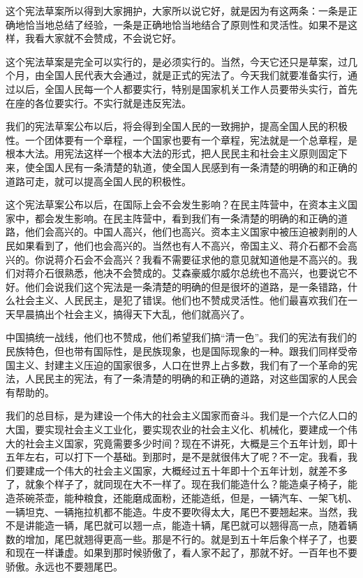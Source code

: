 这个宪法草案所以得到大家拥护，大家所以说它好，就是因为有这两条：一条是正确地恰当地总结了经验，一条是正确地恰当地结合了原则性和灵活性。如果不是这样，我看大家就不会赞成，不会说它好。

这个宪法草案是完全可以实行的，是必须实行的。当然，今天它还只是草案，过几个月，由全国人民代表大会通过，就是正式的宪法了。今天我们就要准备实行，通过以后，全国人民每一个人都要实行，特别是国家机关工作人员要带头实行，首先在座的各位要实行。不实行就是违反宪法。

我们的宪法草案公布以后，将会得到全国人民的一致拥护，提高全国人民的积极性。一个团体要有一个章程，一个国家也要有一个章程，宪法就是一个总章程，是根本大法。用宪法这样一个根本大法的形式，把人民民主和社会主义原则固定下来，使全国人民有一条清楚的轨道，使全国人民感到有一条清楚的明确的和正确的道路可走，就可以提高全国人民的积极性。

这个宪法草案公布以后，在国际上会不会发生影响？在民主阵营中，在资本主义国家中，都会发生影响。在民主阵营中，看到我们有一条清楚的明确的和正确的道路，他们会高兴的。中国人高兴，他们也高兴。资本主义国家中被压迫被剥削的人民如果看到了，他们也会高兴的。当然也有人不高兴，帝国主义、蒋介石都不会高兴的。你说蒋介石会不会高兴？我看不需要征求他的意见就知道他是不高兴的。我们对蒋介石很熟悉，他决不会赞成的。艾森豪威尔威尔总统也不高兴，也要说它不好。他们会说我们这个宪法是一条清楚的明确的但是很坏的道路，是一条错路，什么社会主义、人民民主，是犯了错误。他们也不赞成灵活性。他们最喜欢我们在一天早晨搞出个社会主义，搞得天下大乱，他们就高兴了。

中国搞统一战线，他们也不赞成，他们希望我们搞“清一色”。我们的宪法有我们的民族特色，但也带有国际性，是民族现象，也是国际现象的一种。跟我们同样受帝国主义、封建主义压迫的国家很多，人口在世界上占多数，我们有了一个革命的宪法，人民民主的宪法，有了一条清楚的明确的和正确的道路，对这些国家的人民会有帮助的。

我们的总目标，是为建设一个伟大的社会主义国家而奋斗。我们是一个六亿人口的大国，要实现社会主义工业化，要实现农业的社会主义化、机械化，要建成一个伟大的社会主义国家，究竟需要多少时间？现在不讲死，大概是三个五年计划，即十五年左右，可以打下一个基础。到那时，是不是就很伟大了呢？不一定。我看，我们要建成一个伟大的社会主义国家，大概经过五十年即十个五年计划，就差不多了，就象个样子了，就同现在大不一样了。现在我们能造什么？能造桌子椅子，能造茶碗茶壶，能种粮食，还能磨成面粉，还能造纸，但是，一辆汽车、一架飞机、一辆坦克、一辆拖拉机都不能造。牛皮不要吹得太大，尾巴不要翘起来。当然，我不是讲能造一辆，尾巴就可以翘一点，能造十辆，尾巴就可以翘得高一点，随着辆数的增加，尾巴就翘得更高一些。那是不行的。就是到五十年后象个样子了，也要和现在一样谦虚。如果到那时候骄傲了，看人家不起了，那就不好。一百年也不要骄傲。永远也不要翘尾巴。

